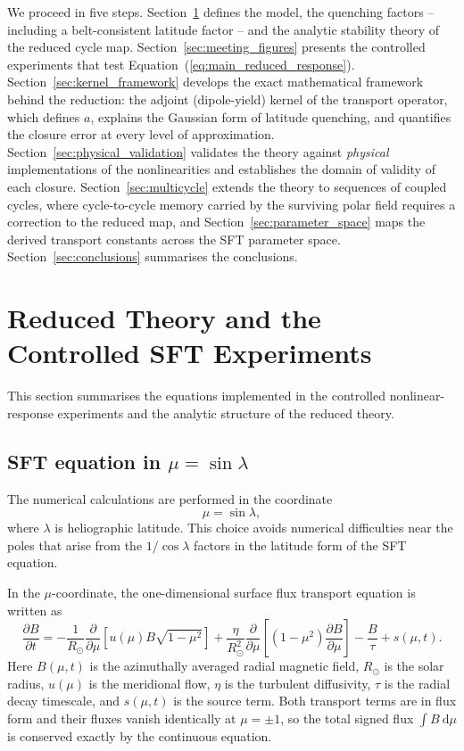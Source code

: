 \documentclass[namedreferences,hyperref,optionalrh,solaromanenum]{spr-sola}
\newcommand{\rmd}{{\ \mathrm d}}
\begin{document}
We proceed in five steps. Section~\ref{sec:equations_used} defines the
model, the quenching factors -- including a belt-consistent latitude
factor -- and the analytic stability theory of the reduced cycle map.
Section~\ref{sec:meeting_figures} presents the controlled experiments that
test Equation~(\ref{eq:main_reduced_response}).
Section~\ref{sec:kernel_framework} develops the exact mathematical
framework behind the reduction: the adjoint (dipole-yield) kernel of the
transport operator, which defines $a$, explains the Gaussian form of
latitude quenching, and quantifies the closure error at every level of
approximation. Section~\ref{sec:physical_validation} validates the theory
against \emph{physical} implementations of the nonlinearities and
establishes the domain of validity of each closure.
Section~\ref{sec:multicycle} extends the theory to sequences of coupled
cycles, where cycle-to-cycle memory carried by the surviving polar field
requires a correction to the reduced map, and
Section~\ref{sec:parameter_space} maps the derived transport constants
across the SFT parameter space. Section~\ref{sec:conclusions} summarises
the conclusions.

\section{Reduced Theory and the Controlled SFT Experiments}
\label{sec:equations_used}

This section summarises the equations implemented in the controlled
nonlinear-response experiments and the analytic structure of the reduced
theory.

\subsection{SFT equation in \texorpdfstring{$\mu=\sin\lambda$}{mu = sin lambda}}
\label{subsec:mu_sft}

The numerical calculations are performed in the coordinate
%
\begin{equation}
\mu=\sin\lambda,
\label{eq:mu_def}
\end{equation}
%
where $\lambda$ is heliographic latitude. This choice avoids numerical
difficulties near the poles that arise from the $1/\cos\lambda$ factors in
the latitude form of the SFT equation.

In the $\mu$-coordinate, the one-dimensional surface flux transport
equation is written as
%
\begin{equation}
\frac{\partial B}{\partial t}
=
-\frac{1}{R_\odot}
\frac{\partial}{\partial \mu}
\left[
u(\mu)B\sqrt{1-\mu^2}
\right]
+
\frac{\eta}{R_\odot^2}
\frac{\partial}{\partial \mu}
\left[
(1-\mu^2)
\frac{\partial B}{\partial \mu}
\right]
-
\frac{B}{\tau}
+
s(\mu,t).
\label{eq:sft_mu}
\end{equation}
%
Here $B(\mu,t)$ is the azimuthally averaged radial magnetic field,
$R_\odot$ is the solar radius, $u(\mu)$ is the meridional flow, $\eta$ is
the turbulent diffusivity, $\tau$ is the radial decay timescale, and
$s(\mu,t)$ is the source term. Both transport terms are in flux form and
their fluxes vanish identically at $\mu=\pm1$, so the total signed flux
$\int B\rmd\mu$ is conserved exactly by the continuous equation.
\end{document}
